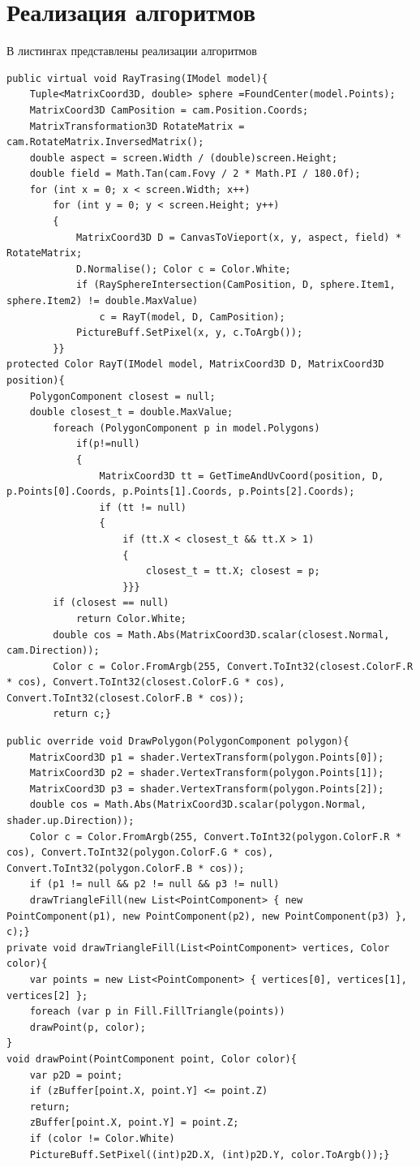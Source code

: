 \section{Реализация алгоритмов}
В листингах представлены реализации алгоритмов
\begin{center}
\begin{lstlisting}[label=l1, caption={Алгоритм рэйкастинга}]
 public virtual void RayTrasing(IModel model){
	Tuple<MatrixCoord3D, double> sphere =FoundCenter(model.Points);
	MatrixCoord3D CamPosition = cam.Position.Coords;
	MatrixTransformation3D RotateMatrix = cam.RotateMatrix.InversedMatrix();
	double aspect = screen.Width / (double)screen.Height;
	double field = Math.Tan(cam.Fovy / 2 * Math.PI / 180.0f);
	for (int x = 0; x < screen.Width; x++)
		for (int y = 0; y < screen.Height; y++)
		{
			MatrixCoord3D D = CanvasToVieport(x, y, aspect, field) * RotateMatrix;
			D.Normalise(); Color c = Color.White;
			if (RaySphereIntersection(CamPosition, D, sphere.Item1, sphere.Item2) != double.MaxValue)
				c = RayT(model, D, CamPosition);
			PictureBuff.SetPixel(x, y, c.ToArgb());
		}}
protected Color RayT(IModel model, MatrixCoord3D D, MatrixCoord3D position){
	PolygonComponent closest = null;
	double closest_t = double.MaxValue;
		foreach (PolygonComponent p in model.Polygons)
			if(p!=null)
			{
				MatrixCoord3D tt = GetTimeAndUvCoord(position, D, p.Points[0].Coords, p.Points[1].Coords, p.Points[2].Coords);
				if (tt != null)
				{
					if (tt.X < closest_t && tt.X > 1)
					{
						closest_t = tt.X; closest = p;
					}}}
		if (closest == null)
			return Color.White;
		double cos = Math.Abs(MatrixCoord3D.scalar(closest.Normal, cam.Direction));
		Color c = Color.FromArgb(255, Convert.ToInt32(closest.ColorF.R * cos), Convert.ToInt32(closest.ColorF.G * cos), Convert.ToInt32(closest.ColorF.B * cos));
		return c;}
\end{lstlisting}
\begin{lstlisting}[label=l2, caption={Алгоритм Z-буфера}]
public override void DrawPolygon(PolygonComponent polygon){
	MatrixCoord3D p1 = shader.VertexTransform(polygon.Points[0]);
	MatrixCoord3D p2 = shader.VertexTransform(polygon.Points[1]);
	MatrixCoord3D p3 = shader.VertexTransform(polygon.Points[2]);
	double cos = Math.Abs(MatrixCoord3D.scalar(polygon.Normal, shader.up.Direction));
	Color c = Color.FromArgb(255, Convert.ToInt32(polygon.ColorF.R * cos), Convert.ToInt32(polygon.ColorF.G * cos), Convert.ToInt32(polygon.ColorF.B * cos));
	if (p1 != null && p2 != null && p3 != null)
	drawTriangleFill(new List<PointComponent> { new PointComponent(p1), new PointComponent(p2), new PointComponent(p3) }, c);}
private void drawTriangleFill(List<PointComponent> vertices, Color color){
	var points = new List<PointComponent> { vertices[0], vertices[1], vertices[2] };	
	foreach (var p in Fill.FillTriangle(points))
	drawPoint(p, color);
}
void drawPoint(PointComponent point, Color color){
	var p2D = point;
	if (zBuffer[point.X, point.Y] <= point.Z)
	return;
	zBuffer[point.X, point.Y] = point.Z;
	if (color != Color.White)
	PictureBuff.SetPixel((int)p2D.X, (int)p2D.Y, color.ToArgb());}
\end{lstlisting}
\end{center}

